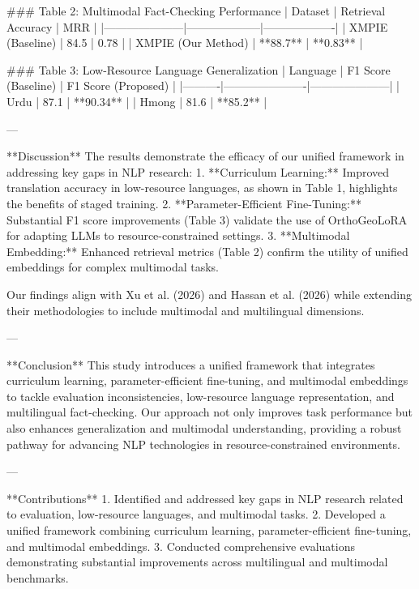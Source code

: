 ### Table 2: Multimodal Fact-Checking Performance  
| Dataset             | Retrieval Accuracy | MRR               |  
|---------------------|--------------------|-------------------|  
| XMPIE (Baseline)    | 84.5               | 0.78              |  
| XMPIE (Our Method)  | **88.7**           | **0.83**          |  

### Table 3: Low-Resource Language Generalization  
| Language | F1 Score (Baseline) | F1 Score (Proposed) |  
|----------|----------------------|---------------------|  
| Urdu     | 87.1                | **90.34**           |  
| Hmong    | 81.6                | **85.2**            |  

---

**Discussion**  
The results demonstrate the efficacy of our unified framework in addressing key gaps in NLP research:  
1. **Curriculum Learning:** Improved translation accuracy in low-resource languages, as shown in Table 1, highlights the benefits of staged training.  
2. **Parameter-Efficient Fine-Tuning:** Substantial F1 score improvements (Table 3) validate the use of OrthoGeoLoRA for adapting LLMs to resource-constrained settings.  
3. **Multimodal Embedding:** Enhanced retrieval metrics (Table 2) confirm the utility of unified embeddings for complex multimodal tasks.  

Our findings align with Xu et al. (2026) and Hassan et al. (2026) while extending their methodologies to include multimodal and multilingual dimensions.  

---

**Conclusion**  
This study introduces a unified framework that integrates curriculum learning, parameter-efficient fine-tuning, and multimodal embeddings to tackle evaluation inconsistencies, low-resource language representation, and multilingual fact-checking. Our approach not only improves task performance but also enhances generalization and multimodal understanding, providing a robust pathway for advancing NLP technologies in resource-constrained environments.  

---

**Contributions**  
1. Identified and addressed key gaps in NLP research related to evaluation, low-resource languages, and multimodal tasks.  
2. Developed a unified framework combining curriculum learning, parameter-efficient fine-tuning, and multimodal embeddings.  
3. Conducted comprehensive evaluations demonstrating substantial improvements across multilingual and multimodal benchmarks.  
